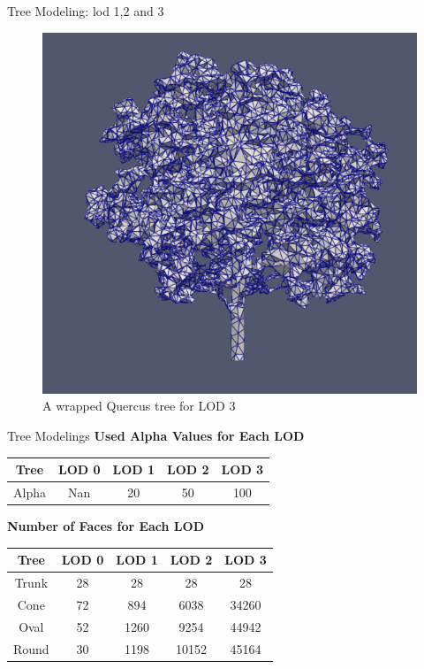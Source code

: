 \documentclass[10pt]{beamer}
\begin{document}
\begin{frame}{Tree Modeling: lod 1,2 and 3}
\begin{figure}[h]
\begin{minipage}{0.3\textwidth}
			\caption{A wrapped Quercus tree for LOD 2}
			\label{fig:figure2}
		\end{minipage}
		\begin{minipage}{0.33\textwidth}
			\centering
			\includegraphics[width=\textwidth]{images/tree-round_lod3.png}
			\caption{A wrapped Quercus tree for LOD 3}
			\label{fig:figure2}
		\end{minipage}
	\end{figure}
\end{frame}


\begin{frame}{Tree Modelings}
	\centering
    \textbf{Used Alpha Values for Each LOD}
    \begin{tabular}{|c|c|c|c|c|}
        \hline
        Tree & LOD 0 & LOD 1 & LOD 2 & LOD 3 \\
        \hline
        Alpha & Nan & 20 & 50 & 100 \\
        \hline
    \end{tabular}

    \vspace{1em} %

    \textbf{Number of Faces for Each LOD}
    \begin{tabular}{|c|c|c|c|c|}
        \hline
        Tree & LOD 0 & LOD 1 & LOD 2 & LOD 3 \\
        \hline
        Trunk & 28 & 28 & 28 & 28 \\
        Cone & 72 & 894 & 6038 & 34260 \\
        Oval & 52 & 1260 & 9254 & 44942 \\
        Round & 30 & 1198 & 10152 & 45164 \\
        \hline
    \end{tabular}
\end{frame}
\end{document}
